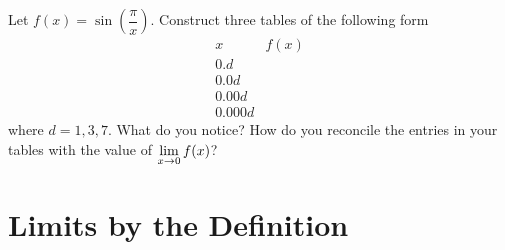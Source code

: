 \begin{exercises}
\begin{exercise} 
Let $f(x) = \sin\left(\dfrac{\pi}{x}\right)$. Construct three tables
of the following form
\[
\begin{array}{c|c}
 x & f(x) \\ \hline
 0.d &   \\
 0.0d &  \\
 0.00d &   \\
 0.000d &  
\end{array}
\]
where $d = 1,3,7$. What do you notice? How do you reconcile the
entries in your tables with the value of $\displaystyle\lim_{x\to 0} f(x)$?
\end{exercise}
\end{exercises}






\section{Limits by the Definition}


